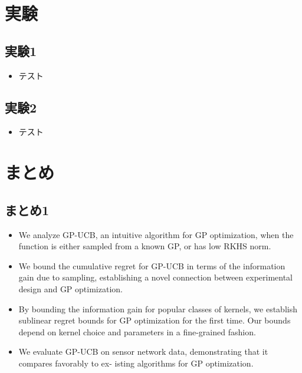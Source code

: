 \documentclass[dvipdfmx, 10.5pt]{beamer}
\begin{document}

\section{実験}

\subsection{実験1}

\begin{frame}{\insertsubsection}
	\begin{itemize}
		\item テスト
	\end{itemize}

\end{frame}


\subsection{実験2}
\begin{frame}{\insertsubsection}
	\begin{itemize}
		\item テスト
	\end{itemize}

\end{frame}

\section{まとめ}


\subsection{まとめ1}

\begin{frame}{\insertsubsection}
	\begin{itemize}
		\item We analyze GP-UCB, an intuitive algorithm for GP optimization, when the function is either sampled from a known GP, or has low RKHS norm.
		\item We bound the cumulative regret for GP-UCB in terms of the information gain due to sampling, establishing a novel connection between experimental design and GP optimization.
		\item By bounding the information gain for popular classes of kernels, we establish sublinear regret bounds for GP optimization for the first time. Our bounds depend on kernel choice and parameters in a fine-grained fashion.
		\item We evaluate GP-UCB on sensor network data, demonstrating that it compares favorably to ex- isting algorithms for GP optimization.
	\end{itemize}

\end{frame}
\end{document}
